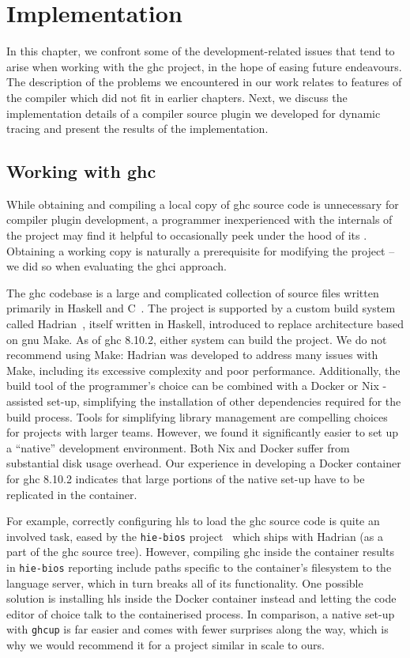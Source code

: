 \documentclass[thesis=B,english]{FITthesis}[2019/12/23]
\begin{document}
\chapter{Implementation}
In this chapter, we confront some of the development-related issues that tend
to arise when working with the \acrshort{ghc} project, in the hope of easing
future endeavours. The description of the problems we encountered in our work
relates to features of the compiler which did not fit in earlier chapters.
Next, we discuss the implementation details of a compiler source plugin we
developed for dynamic tracing and present the results of the implementation.


\section{Working with \acrshort{ghc}}
While obtaining and compiling a local copy of \acrshort{ghc} source code is
unnecessary for compiler plugin development, a programmer inexperienced with
the internals of the project may find it helpful to occasionally peek under the
hood of its . Obtaining a working copy is naturally a
prerequisite for modifying the project -- we did so when evaluating the
\acrshort{ghci} approach.

The \acrshort{ghc} codebase is a large and complicated collection of source
files written primarily in Haskell and C~\cite{arch-ghc}. The project is
supported by a custom build system called Hadrian~\cite{hadrian}, itself
written in Haskell, introduced to replace architecture based on \acrshort{gnu}
Make. As of \acrshort{ghc} 8.10.2, either system can build the project. We do
not recommend using Make: Hadrian was developed to address many issues with
Make, including its excessive complexity and poor performance. Additionally,
the build tool of the programmer's choice can be combined with a Docker or Nix
-assisted set-up, simplifying the installation of other dependencies required
for the build process. Tools for simplifying library management are compelling
choices for projects with larger teams. However, we found it significantly
easier to set up a ``native'' development environment. Both Nix and Docker
suffer from substantial disk usage overhead. Our experience in developing a
Docker container for \acrshort{ghc} 8.10.2 indicates that large portions of the
native set-up have to be replicated in the container.

For example, correctly configuring \acrshort{hls} to load the \acrshort{ghc}
source code is quite an involved task, eased by the \texttt{hie-bios}
project~\cite{gh-hie-bios} which ships with Hadrian (as a part of the
\acrshort{ghc} source tree). However, compiling \acrshort{ghc} inside the
container results in \texttt{hie-bios} reporting include paths specific to the
container's file\-system to the language server, which in turn breaks all of
its functionality. One possible solution is installing \acrshort{hls} inside
the Docker container instead and letting the code editor of choice talk to the
containerised process. In comparison, a native set-up with \texttt{ghcup} is
far easier and comes with fewer surprises along the way, which is why we would
recommend it for a project similar in scale to ours.
\end{document}
